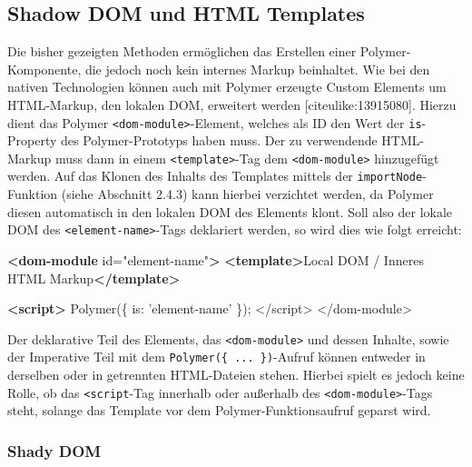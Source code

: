 \documentclass[]{article}
\newenvironment{Shaded}{}{}
\newcommand{\KeywordTok}[1]{\textcolor[rgb]{0.00,0.44,0.13}{\textbf{{#1}}}}
\newcommand{\DataTypeTok}[1]{\textcolor[rgb]{0.56,0.13,0.00}{{#1}}}
\newcommand{\StringTok}[1]{\textcolor[rgb]{0.25,0.44,0.63}{{#1}}}
\newcommand{\SpecialStringTok}[1]{\textcolor[rgb]{0.73,0.40,0.53}{{#1}}}
\newcommand{\OtherTok}[1]{\textcolor[rgb]{0.00,0.44,0.13}{{#1}}}
\newcommand{\OperatorTok}[1]{\textcolor[rgb]{0.40,0.40,0.40}{{#1}}}
\newcommand{\AttributeTok}[1]{\textcolor[rgb]{0.49,0.56,0.16}{{#1}}}
\newcommand{\NormalTok}[1]{{#1}}
\begin{document}
\subsection{Shadow DOM und HTML
Templates}\label{shadow-dom-und-html-templates}

Die bisher gezeigten Methoden ermöglichen das Erstellen einer
Polymer-Komponente, die jedoch noch kein internes Markup beinhaltet. Wie
bei den nativen Technologien können auch mit Polymer erzeugte Custom
Elements um HTML-Markup, den lokalen DOM, erweitert werden
{[}citeulike:13915080{]}. Hierzu dient das Polymer
\texttt{\textless{}dom-module\textgreater{}}-Element, welches als ID den
Wert der \texttt{is}-Property des Polymer-Prototyps haben muss. Der zu
verwendende HTML-Markup muss dann in einem
\texttt{\textless{}template\textgreater{}}-Tag dem
\texttt{\textless{}dom-module\textgreater{}} hinzugefügt werden. Auf das
Klonen des Inhalts des Templates mittels der
\texttt{importNode}-Funktion (siehe Abschnitt 2.4.3) kann hierbei
verzichtet werden, da Polymer diesen automatisch in den lokalen DOM des
Elements klont. Soll also der lokale DOM des
\texttt{\textless{}element-name\textgreater{}}-Tags deklariert werden,
so wird dies wie folgt erreicht:

\begin{Shaded}
\begin{Highlighting}[]
\KeywordTok{<dom-module}\OtherTok{ id=}\StringTok{"element-name"}\KeywordTok{>}
  \KeywordTok{<template>}\NormalTok{Local DOM / Inneres HTML Markup}\KeywordTok{</template>}

  \KeywordTok{<script>}
    \AttributeTok{Polymer}\NormalTok{(}\OperatorTok{\{}
      \DataTypeTok{is}\OperatorTok{:} \StringTok{'element-name'}
    \OperatorTok{\}}\NormalTok{)}\OperatorTok{;}
  \OperatorTok{<}\SpecialStringTok{/script>}
\SpecialStringTok{</dom}\OperatorTok{-}\NormalTok{module}\OperatorTok{>}
\end{Highlighting}
\end{Shaded}

Der deklarative Teil des Elements, das
\texttt{\textless{}dom-module\textgreater{}} und dessen Inhalte, sowie
der Imperative Teil mit dem \texttt{Polymer(\{\ ...\ \})}-Aufruf können
entweder in derselben oder in getrennten HTML-Dateien stehen. Hierbei
spielt es jedoch keine Rolle, ob das \texttt{\textless{}script}-Tag
innerhalb oder außerhalb des
\texttt{\textless{}dom-module\textgreater{}}-Tags steht, solange das
Template vor dem Polymer-Funktionsaufruf geparst wird.

\subsubsection{Shady DOM}\label{shady-dom}
\end{document}
